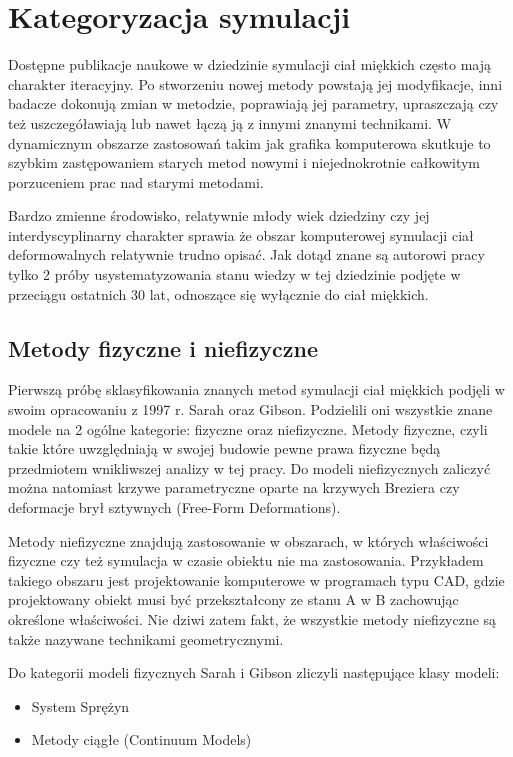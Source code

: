 \section{Kategoryzacja symulacji}

Dostępne publikacje naukowe w dziedzinie symulacji ciał miękkich często mają charakter
iteracyjny. Po stworzeniu nowej metody powstają jej modyfikacje, inni badacze
dokonują zmian w metodzie, poprawiają jej parametry, upraszczają czy też
uszczegóławiają lub nawet łączą ją z innymi znanymi technikami. W 
dynamicznym obszarze zastosowań takim jak grafika komputerowa skutkuje to
szybkim zastępowaniem starych metod nowymi i niejednokrotnie całkowitym
porzuceniem prac nad starymi metodami. 

Bardzo zmienne środowisko, relatywnie młody wiek dziedziny czy jej 
interdyscyplinarny charakter sprawia
że obszar komputerowej symulacji ciał deformowalnych relatywnie trudno opisać.
Jak dotąd znane są autorowi pracy tylko 2 próby usystematyzowania stanu wiedzy w
tej dziedzinie podjęte w przeciągu ostatnich 30 lat, odnoszące się wyłącznie do
ciał miękkich.

\subsection{Metody fizyczne i niefizyczne}

Pierwszą próbę sklasyfikowania znanych metod symulacji ciał miękkich
podjęli w swoim opracowaniu z 1997 r. Sarah oraz Gibson\cite{TR97-19}. Podzielili
oni wszystkie znane modele na 2 ogólne kategorie: fizyczne oraz niefizyczne. Metody fizyczne, czyli
takie które uwzględniają w swojej budowie pewne prawa fizyczne będą przedmiotem
wnikliwszej analizy w tej pracy. Do modeli niefizycznych zaliczyć można natomiast
krzywe parametryczne oparte na krzywych Breziera czy deformacje brył sztywnych (Free-Form Deformations).\cite{pbdo}

Metody niefizyczne znajdują zastosowanie w obszarach, w których właściwości
fizyczne czy też symulacja w czasie obiektu nie ma zastosowania. Przykładem
takiego obszaru jest projektowanie komputerowe w programach typu CAD, gdzie
projektowany obiekt musi być przekształcony ze stanu A w B zachowując określone
właściwości. Nie dziwi zatem fakt, że wszystkie metody niefizyczne są także 
nazywane technikami geometrycznymi.

Do kategorii modeli fizycznych Sarah i Gibson zliczyli następujące klasy modeli:
\begin{itemize}
\item System Sprężyn
\item Metody ciągłe (Continuum Models)
\end{itemize}

